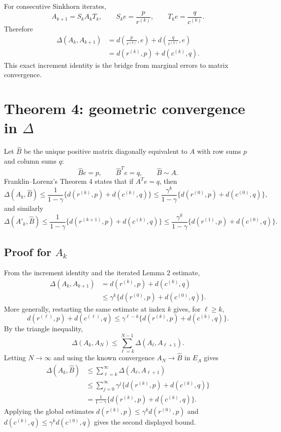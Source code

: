 For consecutive Sinkhorn iterates,
\[
  A_{k+1}=S_kA_kT_k,
  \qquad
  S_ke=\frac{p}{r^{(k)}},
  \qquad
  T_ke=\frac{q}{c^{(k)}}.
\]
Therefore
\begin{align*}
  \Delta(A_k,A_{k+1})
  &=d\left(\frac{p}{r^{(k)}},e\right)
    +d\left(\frac{q}{c^{(k)}},e\right)\\
  &=d(r^{(k)},p)+d(c^{(k)},q).
\end{align*}
This exact increment identity is the bridge from marginal errors to matrix convergence.

\section*{Theorem 4: geometric convergence in $\Delta$}
Let $\widehat B$ be the unique positive matrix diagonally equivalent to $A$ with
row sums $p$ and column sums $q$:
\[
  \widehat B e=p,
  \qquad
  \widehat B^T e=q,
  \qquad
  \widehat B\sim A.
\]
Franklin--Lorenz's Theorem 4 states that if $A^Te=q$, then
\[
  \Delta(A_k,\widehat B)
  \le \frac{1}{1-\gamma}
        \{d(r^{(k)},p)+d(c^{(k)},q)\}
  \le \frac{\gamma^k}{1-\gamma}
        \{d(r^{(0)},p)+d(c^{(0)},q)\},
\]
and similarly
\[
  \Delta(A'_k,\widehat B)
  \le \frac{1}{1-\gamma}
        \{d(r^{(k+1)},p)+d(c^{(k)},q)\}
  \le \frac{\gamma^k}{1-\gamma}
        \{d(r^{(1)},p)+d(c^{(0)},q)\}.
\]

\subsection*{Proof for $A_k$}
From the increment identity and the iterated Lemma 2 estimate,
\begin{align*}
  \Delta(A_k,A_{k+1})
  &=d(r^{(k)},p)+d(c^{(k)},q)\\
  &\le \gamma^k\{d(r^{(0)},p)+d(c^{(0)},q)\}.
\end{align*}
More generally, restarting the same estimate at index $k$ gives, for $\ell\ge k$,
\[
  d(r^{(\ell)},p)+d(c^{(\ell)},q)
  \le \gamma^{\ell-k}\{d(r^{(k)},p)+d(c^{(k)},q)\}.
\]
By the triangle inequality,
\[
  \Delta(A_k,A_N)
  \le \sum_{\ell=k}^{N-1}\Delta(A_\ell,A_{\ell+1}).
\]
Letting $N\to\infty$ and using the known convergence $A_N\to\widehat B$ in
$E_A$ gives
\begin{align*}
  \Delta(A_k,\widehat B)
  &\le \sum_{\ell=k}^{\infty}\Delta(A_\ell,A_{\ell+1})\\
  &\le \sum_{j=0}^{\infty}\gamma^j
       \{d(r^{(k)},p)+d(c^{(k)},q)\}\\
  &=\frac{1}{1-\gamma}\{d(r^{(k)},p)+d(c^{(k)},q)\}.
\end{align*}
Applying the global estimates
$d(r^{(k)},p)\le \gamma^kd(r^{(0)},p)$ and
$d(c^{(k)},q)\le \gamma^kd(c^{(0)},q)$ gives the second displayed bound.

